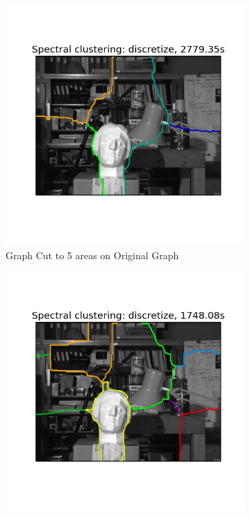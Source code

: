 \begin{figure}[h!]
        \centering
        \begin{subfigure}[h]{0.33\textwidth}
                \includegraphics[width=\textwidth]{fig/592_large_5.png}
                \caption{Graph Cut to 5 areas on Original Graph}
                \label{fig:graphcut_5}
        \end{subfigure}%
        \begin{subfigure}[h]{0.33\textwidth}
                \includegraphics[width=\textwidth]{fig/592_large_10.png}

\end{subfigure}
\end{figure}
